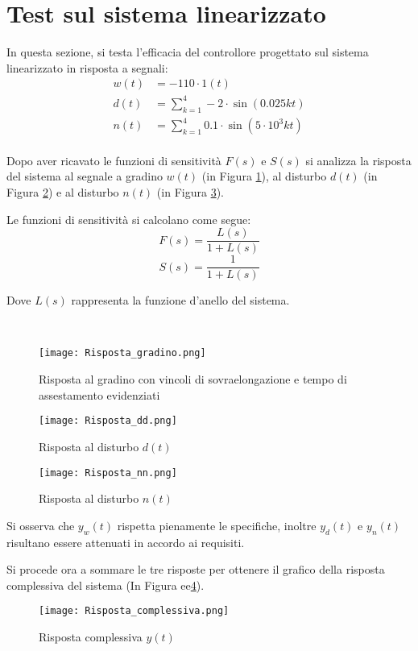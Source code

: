 \documentclass[a4paper, 11pt]{article}
\begin{document}
\clearpage
\section{Test sul sistema linearizzato}
\label{sec:testsistemalinearizzato}

In questa sezione, si testa l'efficacia del controllore progettato sul sistema linearizzato in risposta a segnali:
\begin{align*}
w(t) &= -110 \cdot 1(t) \\
d(t) &= \sum_{k=1}^{4} -2 \cdot \sin(0.025k t) \\
n(t) &= \sum_{k=1}^{4} 0.1 \cdot \sin(5\cdot10^3k t)
\end{align*}
\\
Dopo aver ricavato le funzioni di sensitività $F(s)$ e $S(s)$ si analizza la risposta del sistema al segnale a gradino $w(t)$ (in Figura \ref{Figura 6}), al disturbo $d(t)$ (in Figura \ref{Figura 7}) e al disturbo $n(t)$ (in Figura \ref{Figura 8}).

Le funzioni di sensitività si calcolano come segue:
\[
    F(s) = \frac{L(s)}{1 + L(s)} 
    \]
    \[
    S(s) = \frac{1}{1 + L(s)}
\]

Dove \( L(s) \) rappresenta la funzione d'anello del sistema. 

\\
\begin{figure}[H]
	\centering
	\texttt{[image: Risposta\_gradino.png]}
	\caption[]{Risposta al gradino con vincoli di sovraelongazione e tempo di assestamento evidenziati}
	\label{Figura 6}
\end{figure}
\begin{figure}[H]
	\centering
	\texttt{[image: Risposta\_dd.png]}
	\caption[]{Risposta al disturbo $d(t)$}
	\label{Figura 7}
\end{figure}

\begin{figure}[H]
	\centering
	\texttt{[image: Risposta\_nn.png]}
	\caption[]{Risposta al disturbo $n(t)$}
	\label{Figura 8}
\end{figure}

Si osserva che $y_w(t)$ rispetta pienamente le specifiche, inoltre $y_d(t)$ e $y_n(t)$ risultano essere attenuati in accordo ai requisiti.
\\
\clearpage

Si procede ora a sommare le tre risposte per ottenere il grafico della risposta complessiva del sistema (In Figura ee\ref{Figura 9}).\\
\begin{figure}[H]
    \centering
    \texttt{[image: Risposta\_complessiva.png]}
    \caption[]{Risposta complessiva $y(t)$}
    \label{Figura 9}
\end{figure}
\end{document}
